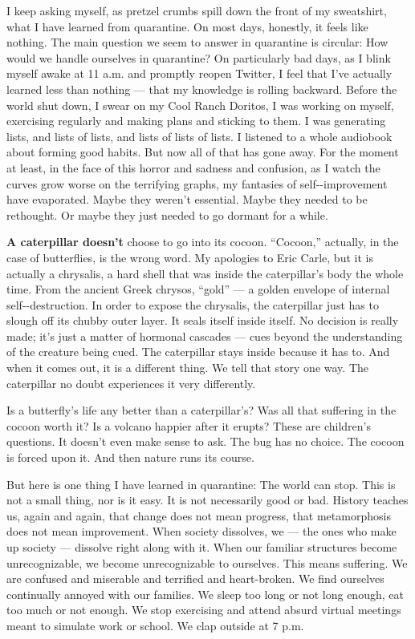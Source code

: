 I keep asking myself, as pretzel crumbs spill down the front of my
sweatshirt, what I have learned from quarantine. On most days, honestly,
it feels like nothing. The main question we seem to answer in quarantine
is circular: How would we handle ourselves in quarantine? On
particularly bad days, as I blink myself awake at 11 a.m. and promptly
reopen Twitter, I feel that I've actually learned less than nothing ---
that my knowledge is rolling backward. Before the world shut down, I
swear on my Cool Ranch Doritos, I was working on myself, exercising
regularly and making plans and sticking to them. I was generating lists,
and lists of lists, and lists of lists of lists. I listened to a whole
audiobook about forming good habits. But now all of that has gone away.
For the moment at least, in the face of this horror and sadness and
confusion, as I watch the curves grow worse on the terrifying graphs, my
fantasies of self-\/-improvement have evaporated. Maybe they weren't
essential. Maybe they needed to be rethought. Or maybe they just needed
to go dormant for a while.

\textbf{A caterpillar doesn't} choose to go into its cocoon. ``Cocoon,''
actually, in the case of butterflies, is the wrong word. My apologies to
Eric Carle, but it is actually a chrysalis, a hard shell that was inside
the caterpillar's body the whole time. From the ancient Greek chrysos,
``gold'' --- a golden envelope of internal self-\/-destruction. In order
to expose the chrysalis, the caterpillar just has to slough off its
chubby outer layer. It seals itself inside itself. No decision is really
made; it's just a matter of hormonal cascades --- cues beyond the
understanding of the creature being cued. The caterpillar stays inside
because it has to. And when it comes out, it is a different thing. We
tell that story one way. The caterpillar no doubt experiences it very
differently.

Is a butterfly's life any better than a caterpillar's? Was all that
suffering in the cocoon worth it? Is a volcano happier after it erupts?
These are children's questions. It doesn't even make sense to ask. The
bug has no choice. The cocoon is forced upon it. And then nature runs
its course.

But here is one thing I have learned in quarantine: The world can stop.
This is not a small thing, nor is it easy. It is not necessarily good or
bad. History teaches us, again and again, that change does not mean
progress, that metamorphosis does not mean improvement. When society
dissolves, we --- the ones who make up society --- dissolve right along
with it. When our familiar structures become unrecognizable, we become
unrecognizable to ourselves. This means suffering. We are confused and
miserable and terrified and heart-broken. We find ourselves continually
annoyed with our families. We sleep too long or not long enough, eat too
much or not enough. We stop exercising and attend absurd virtual
meetings meant to simulate work or school. We clap outside at 7 p.m.

